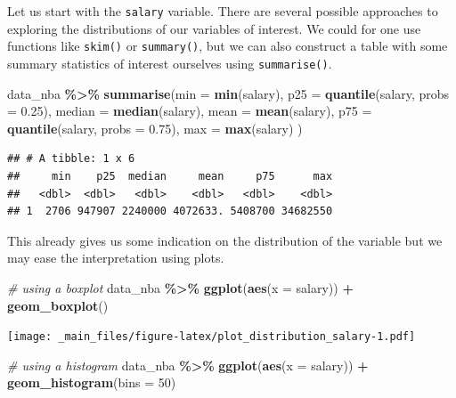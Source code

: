 \documentclass[
]{book}
\newenvironment{Shaded}{\begin{snugshade}}{\end{snugshade}}
\newcommand{\AttributeTok}[1]{\textcolor[rgb]{0.13,0.29,0.53}{#1}}
\newcommand{\CommentTok}[1]{\textcolor[rgb]{0.56,0.35,0.01}{\textit{#1}}}
\newcommand{\DecValTok}[1]{\textcolor[rgb]{0.00,0.00,0.81}{#1}}
\newcommand{\FloatTok}[1]{\textcolor[rgb]{0.00,0.00,0.81}{#1}}
\newcommand{\FunctionTok}[1]{\textcolor[rgb]{0.13,0.29,0.53}{\textbf{#1}}}
\newcommand{\NormalTok}[1]{#1}
\newcommand{\SpecialCharTok}[1]{\textcolor[rgb]{0.81,0.36,0.00}{\textbf{#1}}}
\begin{document}
Let us start with the \texttt{salary} variable. There are several possible approaches to exploring the distributions of our variables of interest. We could for one use functions like \texttt{skim()} or \texttt{summary()}, but we can also construct a table with some summary statistics of interest ourselves using \texttt{summarise()}.

\begin{Shaded}
\begin{Highlighting}[]
\NormalTok{data\_nba }\SpecialCharTok{\%\textgreater{}\%} 
  \FunctionTok{summarise}\NormalTok{(}\AttributeTok{min =} \FunctionTok{min}\NormalTok{(salary),}
            \AttributeTok{p25 =} \FunctionTok{quantile}\NormalTok{(salary, }\AttributeTok{probs =} \FloatTok{0.25}\NormalTok{),}
            \AttributeTok{median =} \FunctionTok{median}\NormalTok{(salary),}
            \AttributeTok{mean =} \FunctionTok{mean}\NormalTok{(salary),}
            \AttributeTok{p75 =} \FunctionTok{quantile}\NormalTok{(salary, }\AttributeTok{probs =} \FloatTok{0.75}\NormalTok{),}
            \AttributeTok{max =} \FunctionTok{max}\NormalTok{(salary)}
\NormalTok{            )}
\end{Highlighting}
\end{Shaded}

\begin{verbatim}
## # A tibble: 1 x 6
##     min    p25  median     mean     p75      max
##   <dbl>  <dbl>   <dbl>    <dbl>   <dbl>    <dbl>
## 1  2706 947907 2240000 4072633. 5408700 34682550
\end{verbatim}

This already gives us some indication on the distribution of the variable but we may ease the interpretation using plots.

\begin{Shaded}
\begin{Highlighting}[]
\CommentTok{\# using a boxplot}
\NormalTok{data\_nba }\SpecialCharTok{\%\textgreater{}\%}
  \FunctionTok{ggplot}\NormalTok{(}\FunctionTok{aes}\NormalTok{(}\AttributeTok{x =}\NormalTok{ salary)) }\SpecialCharTok{+}
  \FunctionTok{geom\_boxplot}\NormalTok{()}
\end{Highlighting}
\end{Shaded}

\texttt{[image: \_main\_files/figure-latex/plot\_distribution\_salary-1.pdf]}

\begin{Shaded}
\begin{Highlighting}[]
\CommentTok{\# using a histogram}
\NormalTok{data\_nba }\SpecialCharTok{\%\textgreater{}\%}
  \FunctionTok{ggplot}\NormalTok{(}\FunctionTok{aes}\NormalTok{(}\AttributeTok{x =}\NormalTok{ salary)) }\SpecialCharTok{+}
  \FunctionTok{geom\_histogram}\NormalTok{(}\AttributeTok{bins =} \DecValTok{50}\NormalTok{)}
\end{Highlighting}
\end{Shaded}
\end{document}
